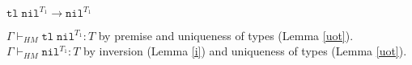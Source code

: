 \begin{case}
$\mathtt{tl}\;\mathtt{nil}^{T_{1}}\rightarrow\mathtt{nil}^{T_{1}}$

$\Gamma\vdash_{HM}\mathtt{tl}\;\mathtt{nil}^{T_{1}}:T$ by premise and uniqueness of types (Lemma \ref{uot}).  $\Gamma\vdash_{HM}\mathtt{nil}^{T_{1}}:T$ by inversion (Lemma \ref{i}) and uniqueness of types (Lemma \ref{uot}).
\end{case}